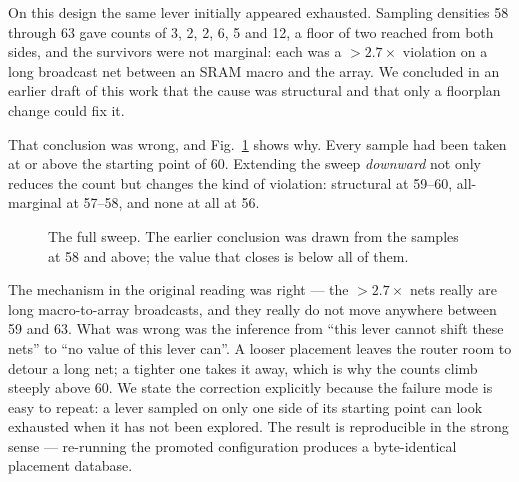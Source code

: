 \documentclass[conference,a4paper]{APSIPA2026}
\begin{document}
On this design the same lever initially appeared exhausted. Sampling densities 58 through 63 gave counts of 3, 2, 2, 6, 5 and 12, a floor of two reached from both sides, and the survivors were not marginal: each was a $>2.7\times$ violation on a long broadcast net between an SRAM macro and the array. We concluded in an earlier draft of this work that the cause was structural and that only a floorplan change could fix it.

That conclusion was wrong, and Fig.~\ref{fig:sweep} shows why. Every sample had been taken at or above the starting point of 60. Extending the sweep \emph{downward} not only reduces the count but changes the kind of violation: structural at 59--60, all-marginal at 57--58, and none at all at 56.

\begin{figure}[t]
\centering
{}
\caption{The full sweep. The earlier conclusion was drawn from the samples at 58 and above; the value that closes is below all of them.}
\label{fig:sweep}
\end{figure}

The mechanism in the original reading was right --- the $>2.7\times$ nets really are long macro-to-array broadcasts, and they really do not move anywhere between 59 and 63. What was wrong was the inference from ``this lever cannot shift these nets'' to ``no value of this lever can''. A looser placement leaves the router room to detour a long net; a tighter one takes it away, which is why the counts climb steeply above 60. We state the correction explicitly because the failure mode is easy to repeat: a lever sampled on only one side of its starting point can look exhausted when it has not been explored. The result is reproducible in the strong sense --- re-running the promoted configuration produces a byte-identical placement database.
\end{document}
